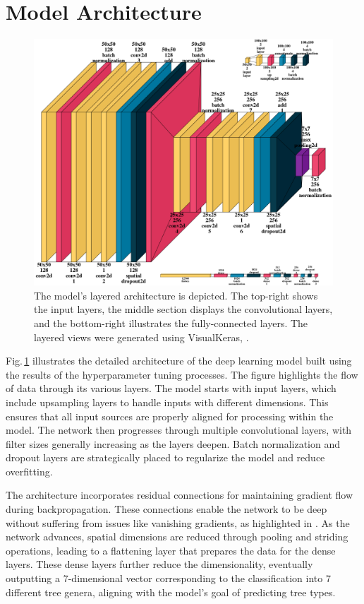 \section{Model Architecture}

\begin{figure}[ht]
    \centering
    \includegraphics[width=0.9\linewidth]{figures/figures_tuner/model_layered_view.png}
    \caption{The model's layered architecture is depicted. The top-right shows the input layers, the middle section displays the convolutional layers, and the bottom-right illustrates the fully-connected layers. The layered views were generated using VisualKeras, \cite{visualkeras}.}
    \label{fig:model_layered_view}
\end{figure}

Fig.\,\ref{fig:model_layered_view} illustrates the detailed architecture of the deep learning model built using the results of the hyperparameter tuning processes. The figure highlights the flow of data through its various layers. The model starts with input layers, which include upsampling layers to handle inputs with different dimensions. This ensures that all input sources are properly aligned for processing within the model. The network then progresses through multiple convolutional layers, with filter sizes generally increasing as the layers deepen. Batch normalization and dropout layers are strategically placed to regularize the model and reduce overfitting.

The architecture incorporates residual connections for maintaining gradient flow during backpropagation. These connections enable the network to be deep without suffering from issues like vanishing gradients, as highlighted in \cite{resnet}. As the network advances, spatial dimensions are reduced through pooling and striding operations, leading to a flattening layer that prepares the data for the dense layers. These dense layers further reduce the dimensionality, eventually outputting a 7-dimensional vector corresponding to the classification into 7 different tree genera, aligning with the model's goal of predicting tree types.



